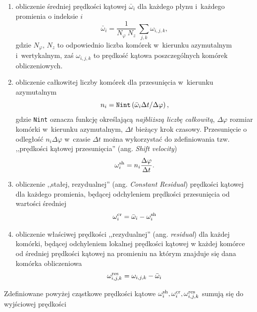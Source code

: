 \begin{enumerate}
   \item obliczenie średniej prędkości kątowej $\bar{\omega}_i$ dla każdego
      płynu i~każdego promienia o indeksie $i$
      \begin{equation}
         \bar{\omega}_i = \frac{1}{N_\varphi~N_z} ~ \sum_{j,k} \omega_{i,j,k},
      \end{equation}
      gdzie $N_\varphi,\,N_z$ to odpowiednio liczba komórek w~kierunku
      azymutalnym i~wertykalnym, zaś $\omega_{i,j,k}$ to prędkość kątowa
      poszczególnych komórek obliczeniowych.
   \item  obliczenie całkowitej liczby komórek dla przesunięcia w~kierunku
      azymutalnym
      \begin{equation}
         n_i = {\tt Nint} \left( \bar{\omega}_i \Delta t/\Delta \varphi \right),
      \end{equation}
      gdzie {\tt Nint} oznacza funkcję określającą \emph{najbliższą liczbę
      całkowitą}, $\Delta\varphi$ rozmiar komórki w~kierunku azymutalnym,
      $\Delta t$ bieżący krok czasowy. Przesunięcie o odległość $n_i \Delta
      \varphi$ w~czasie $\Delta t$ można wykorzystać do
      zdefiniowania tzw. ,,prędkości kątowej przesunięcia'' (ang. \emph{Shift
      velocity})
      \begin{equation}
         \omega_i^{\rm sh} = n_i \frac{\Delta \varphi}{\Delta t}.
      \end{equation}
   \item obliczenie ,,stałej, rezydualnej'' (ang. \emph{Constant Residual})
      prędkości kątowej  dla każdego promienia, będącej odchyleniem prędkości
      przesunięcia od wartości średniej
      \begin{equation}
         \omega_i^{\rm cr}= \bar{\omega}_i - \omega_i^{\rm sh}
      \end{equation}
   \item obliczenie właściwej prędkości ,,rezydualnej'' (ang. \emph{residual})
      dla każdej komórki, będącej odchyleniem lokalnej prędkości kątowej w
      każdej komórce od średniej prędkości kątowej na promieniu na którym
      znajduje się dana komórka obliczeniowa 
      \begin{equation}
         \omega_{i,j,k}^{\rm res} = \omega_{i,j,k} - \bar{\omega}_i
      \end{equation}
\end{enumerate}
%
Zdefiniowane powyżej cząstkowe prędkości kątowe $\omega_i^{\rm sh},
\omega_i^{\rm cr}, \omega_{i,j,k}^{\rm res}$ sumują się do wyjściowej prędkości
